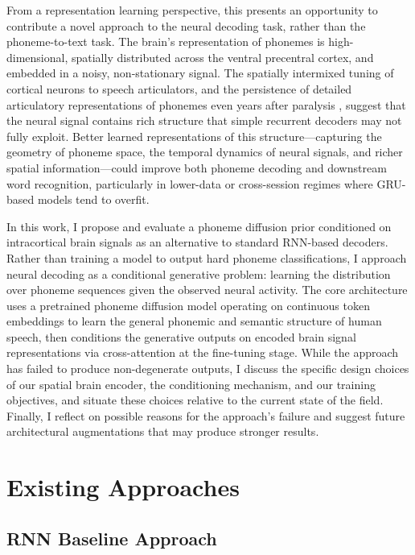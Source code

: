 \documentclass{article}
\begin{document}
From a representation learning perspective, this presents an opportunity to contribute a
novel approach to the neural decoding task, rather than the phoneme-to-text task. The
brain's representation of phonemes is high-dimensional, spatially distributed across the
ventral precentral cortex, and embedded in a noisy, non-stationary signal. The spatially
intermixed tuning of cortical neurons to speech articulators, and the persistence of
detailed articulatory representations of phonemes even years after paralysis
\citep{willett2023high}, suggest that the neural signal contains rich structure that simple
recurrent decoders may not fully exploit. Better learned representations of this
structure---capturing the geometry of phoneme space, the temporal dynamics of neural
signals, and richer spatial information---could improve both phoneme decoding and
downstream word recognition, particularly in lower-data or cross-session regimes where
GRU-based models tend to overfit.

In this work, I propose and evaluate a phoneme diffusion prior conditioned on intracortical
brain signals as an alternative to standard RNN-based decoders. Rather than training a model
to output hard phoneme classifications, I approach neural decoding as a conditional
generative problem: learning the distribution over phoneme sequences given the observed
neural activity. The core architecture uses a pretrained phoneme diffusion model operating on
continuous token embeddings to learn the general phonemic and semantic structure of human
speech, then conditions the generative outputs on encoded brain signal representations via
cross-attention at the fine-tuning stage. While the approach has failed to produce
non-degenerate outputs, I discuss the specific design choices of our spatial brain encoder,
the conditioning mechanism, and our training objectives, and situate these choices relative
to the current state of the field. Finally, I reflect on possible reasons for the approach's
failure and suggest future architectural augmentations that may produce stronger results.

\section{Existing Approaches}
\subsection{RNN Baseline Approach}
\end{document}
